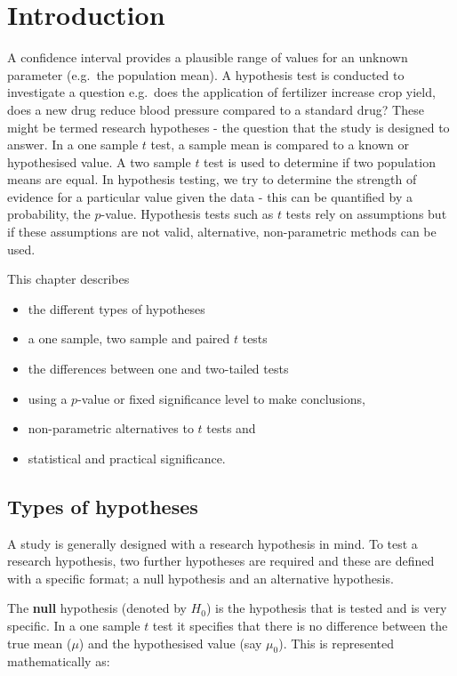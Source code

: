 \documentclass[
  oneside]{krantz}
\providecommand{\tightlist}{%
  \setlength{\itemsep}{0pt}\setlength{\parskip}{0pt}}
\begin{document}
\hypertarget{INThyp}{%
\section{Introduction}\label{INThyp}}

A confidence interval provides a plausible range of values for an unknown parameter (e.g.~the population mean). A hypothesis test is conducted to investigate a question e.g.~does the application of fertilizer increase crop yield, does a new drug reduce blood pressure compared to a standard drug? These might be termed research hypotheses - the question that the study is designed to answer. In a one sample \(t\) test, a sample mean is compared to a known or hypothesised value. A two sample \(t\) test is used to determine if two population means are equal. In hypothesis testing, we try to determine the strength of evidence for a particular value given the data - this can be quantified by a probability, the \(p\)-value. Hypothesis tests such as \(t\) tests rely on assumptions but if these assumptions are not valid, alternative, non-parametric methods can be used.

This chapter describes

\begin{itemize}
\tightlist
\item
  the different types of hypotheses
\item
  a one sample, two sample and paired \(t\) tests
\item
  the differences between one and two-tailed tests
\item
  using a \(p\)-value or fixed significance level to make conclusions,
\item
  non-parametric alternatives to \(t\) tests and
\item
  statistical and practical significance.
\end{itemize}

\hypertarget{types-of-hypotheses}{%
\subsection{Types of hypotheses}\label{types-of-hypotheses}}

A study is generally designed with a research hypothesis in mind. To test a research hypothesis, two further hypotheses are required and these are defined with a specific format; a null hypothesis and an alternative hypothesis.

The \textbf{null} hypothesis (denoted by \(H_0\)) is the hypothesis that is tested and is very specific. In a one sample \(t\) test it specifies that there is no difference between the true mean (\(\mu\)) and the hypothesised value (say \(\mu_0\)). This is represented mathematically as:
\end{document}
